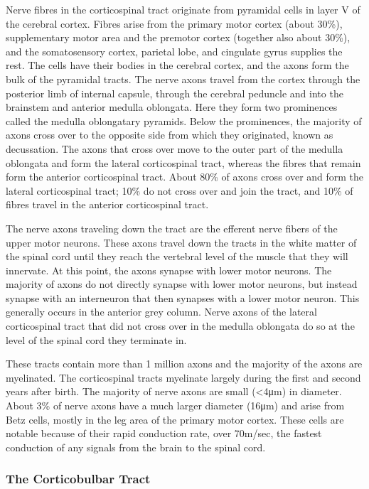 \documentclass[]{book}
\begin{document}
Nerve fibres in the corticospinal tract originate from pyramidal cells in layer V of the cerebral cortex. Fibres arise from the primary motor cortex (about 30\%), supplementary motor area and the premotor cortex (together also about 30\%), and the somatosensory cortex, parietal lobe, and cingulate gyrus supplies the rest. The cells have their bodies in the cerebral cortex, and the axons form the bulk of the pyramidal tracts. The nerve axons travel from the cortex through the posterior limb of internal capsule, through the cerebral peduncle and into the brainstem and anterior medulla oblongata. Here they form two prominences called the medulla oblongatary pyramids. Below the prominences, the majority of axons cross over to the opposite side from which they originated, known as decussation. The axons that cross over move to the outer part of the medulla oblongata and form the lateral corticospinal tract, whereas the fibres that remain form the anterior corticospinal tract. About 80\% of axons cross over and form the lateral corticospinal tract; 10\% do not cross over and join the tract, and 10\% of fibres travel in the anterior corticospinal tract.

The nerve axons traveling down the tract are the efferent nerve fibers of the upper motor neurons. These axons travel down the tracts in the white matter of the spinal cord until they reach the vertebral level of the muscle that they will innervate. At this point, the axons synapse with lower motor neurons. The majority of axons do not directly synapse with lower motor neurons, but instead synapse with an interneuron that then synapses with a lower motor neuron. This generally occurs in the anterior grey column. Nerve axons of the lateral corticospinal tract that did not cross over in the medulla oblongata do so at the level of the spinal cord they terminate in.

These tracts contain more than 1 million axons and the majority of the axons are myelinated. The corticospinal tracts myelinate largely during the first and second years after birth. The majority of nerve axons are small (\textless{}4μm) in diameter. About 3\% of nerve axons have a much larger diameter (16μm) and arise from Betz cells, mostly in the leg area of the primary motor cortex. These cells are notable because of their rapid conduction rate, over 70m/sec, the fastest conduction of any signals from the brain to the spinal cord.

\hypertarget{the-corticobulbar-tract}{%
\subsubsection{The Corticobulbar Tract}\label{the-corticobulbar-tract}}
\end{document}
